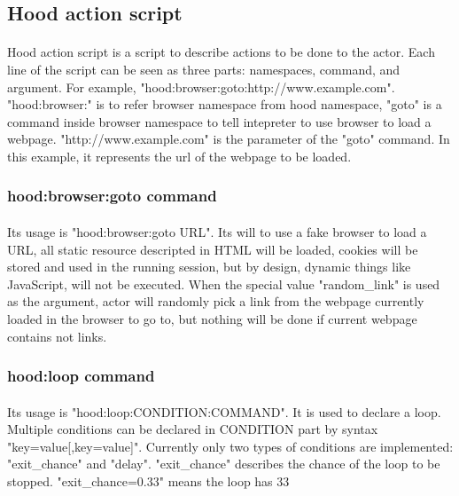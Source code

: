 \documentclass[mscthesis]{usiinfthesis}
\begin{document}
\subsection{Hood action script}
\paragraph{}
Hood action script is a script to describe actions to be done to the actor. Each line of the script can be seen as three parts: namespaces, command, and argument. For example, \newline "hood:browser:goto:http://www.example.com". "hood:browser:" is to refer browser namespace from hood namespace, "goto" is a command inside browser namespace to tell intepreter to use browser to load a webpage. "http://www.example.com" is the parameter of the "goto" command. In this example, it represents the url of the webpage to be loaded.
\subsubsection{hood:browser:goto command}
\paragraph{}
Its usage is "hood:browser:goto URL". Its will to use a fake browser to load a URL, all static resource descripted in HTML will be loaded, cookies will be stored and used in the running session, but by design, dynamic things like JavaScript, will not be executed. When the special value "random\_link" is used as the argument, actor will randomly pick a link from the webpage currently loaded in the browser to go to, but nothing will be done if current webpage contains not links.
\subsubsection{hood:loop command}
\paragraph{}
Its usage is "hood:loop:CONDITION:COMMAND". It is used to declare a loop. Multiple conditions can be declared in CONDITION part by syntax "key=value[,key=value]". Currently only two types of conditions are implemented: "exit\_chance" and "delay". "exit\_chance" describes the chance of the loop to be stopped. "exit\_chance=0.33" means the loop has 33%
\end{document}
